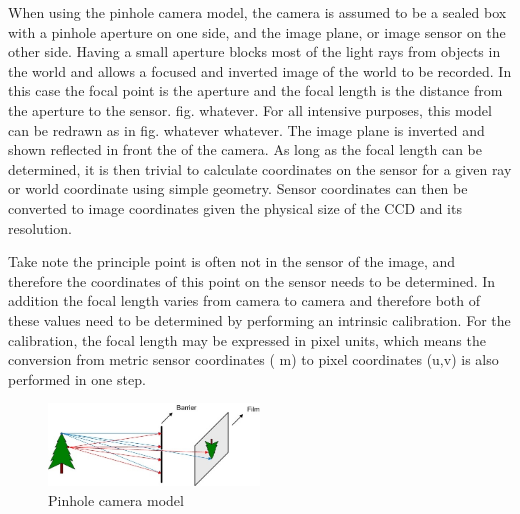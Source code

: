 When using the pinhole camera model, the camera is assumed to be a sealed box with a pinhole aperture on one side, and the image plane, or image sensor on the other side.  Having a small aperture blocks most of the light rays from objects in the world and allows a focused and inverted image of the world to be recorded. In this case the focal point is the aperture and the focal length is the distance from the aperture to the sensor. fig. whatever. For all intensive purposes, this model can be redrawn as in fig. whatever whatever. The image plane is inverted and shown reflected in front the of the camera.  As long as the focal length can be determined, it is then trivial to calculate coordinates on the sensor for a given ray or world coordinate using simple geometry. Sensor coordinates can then be converted to image coordinates given the physical size of the CCD and its resolution.  

Take note the principle point is often not in the sensor of the image, and therefore the coordinates of this point on the sensor needs to be determined.  In addition the focal length varies from camera to camera and therefore both of these values need to be determined by performing an intrinsic calibration. For the calibration, the focal length may be expressed in pixel units, which means the conversion from metric sensor coordinates ( m) to pixel coordinates (u,v) is also performed in one step.


\begin{figure}[h]
  \centering
    \includegraphics[width=0.5\textwidth]{chapters/images/cam_model_fig2}
  \caption{Pinhole camera model}
\end{figure}

